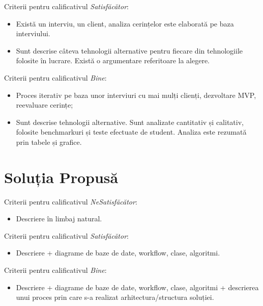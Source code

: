 \documentclass[12pt,a4paper]{report}
\newcommand{\worktype}[1]{[\textit{#1}] }
\newcommand{\dezvoltare}{\worktype{Dezvoltare de produs}}
\newcommand{\ambele}{\worktype{Ambele}}
\begin{document}
Criterii pentru calificativul \textit{Satisfăcător}:
\begin{itemize}
	\item \dezvoltare Există un interviu, un client, analiza cerințelor este elaborată pe baza interviului.
	\item \ambele Sunt descrise câteva tehnologii alternative pentru fiecare din tehnologiile folosite în lucrare. Există o argumentare referitoare la alegere.
\end{itemize}

Criterii pentru calificativul \textit{Bine}:
\begin{itemize}
	\item \dezvoltare Proces iterativ pe baza unor interviuri cu mai mulți clienți, dezvoltare MVP, reevaluare cerințe;
	\item \ambele Sunt descrise tehnologii alternative. Sunt analizate cantitativ și calitativ, folosite benchmarkuri și teste efectuate de student. Analiza este rezumată prin tabele și grafice.
\end{itemize}


\chapter{Soluția Propusă}


Criterii pentru calificativul \textit{Ne\textit{Satisfăcător}}: 
\begin{itemize}
	\item	Descriere în limbaj natural.
\end{itemize}

Criterii pentru calificativul \textit{Satisfăcător}: 
\begin{itemize}
	\item	Descriere + diagrame de baze de date, workflow, clase, algoritmi. 
\end{itemize}

Criterii pentru calificativul \textit{Bine}: 
\begin{itemize}
	\item 	Descriere + diagrame de baze de date, workflow, clase, algoritmi + descrierea unui proces prin care s-a realizat arhitectura/structura soluției.
\end{itemize}
\end{document}
